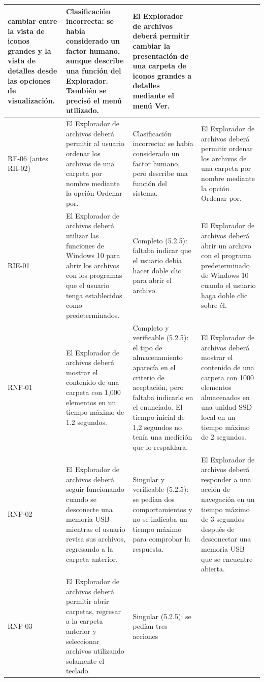 \documentclass[10pt,a4paper]{article}
\begin{document}
{\begin{longtable}{%
>{\raggedright\arraybackslash}p{1cm}%
>{\raggedright\arraybackslash}p{4.8cm}%
>{\raggedright\arraybackslash}p{3.2cm}%
>{\raggedright\arraybackslash}p{5.3cm}%
}
cambiar entre la vista de iconos grandes y la vista
de detalles desde las opciones de visualización. &
Clasificación incorrecta: se había considerado
un factor humano, aunque describe una función
del Explorador. También se precisó el menú utilizado. &
El Explorador de archivos deberá permitir cambiar
la presentación de una carpeta de iconos grandes
a detalles mediante el menú Ver. \\
\hline
RF-06
(antes RH-02) &
El Explorador de archivos deberá permitir al usuario
ordenar los archivos de una carpeta por nombre
mediante la opción Ordenar por. &
Clasificación incorrecta: se había considerado
un factor humano, pero describe una función
del sistema. &
El Explorador de archivos deberá permitir ordenar
los archivos de una carpeta por nombre mediante
la opción Ordenar por. \\
\hline
RIE-01 &
El Explorador de archivos deberá utilizar las funciones
de Windows 10 para abrir los archivos con los programas
que el usuario tenga establecidos como predeterminados. &
Completo (5.2.5): faltaba indicar que el usuario
debía hacer doble clic para abrir el archivo. &
El Explorador de archivos deberá abrir un archivo
con el programa predeterminado de Windows 10
cuando el usuario haga doble clic sobre él. \\
\hline
RNF-01 &
El Explorador de archivos deberá mostrar el contenido
de una carpeta con 1,000 elementos en un tiempo
máximo de 1.2 segundos. &
Completo y verificable (5.2.5): el tipo de
almacenamiento aparecía en el criterio de aceptación,
pero faltaba indicarlo en el enunciado.
El tiempo inicial de 1,2 segundos no tenía
una medición que lo respaldara. &
El Explorador de archivos deberá mostrar el contenido
de una carpeta con 1000 elementos almacenados
en una unidad SSD local en un tiempo máximo
de 2 segundos. \\
\hline
RNF-02 &
El Explorador de archivos deberá seguir funcionando
cuando se desconecte una memoria USB mientras
el usuario revisa sus archivos, regresando a la
carpeta anterior. &
Singular y verificable (5.2.5): se pedían dos
comportamientos y no se indicaba un tiempo
máximo para comprobar la respuesta. &
El Explorador de archivos deberá responder a una
acción de navegación en un tiempo máximo de
3 segundos después de desconectar una memoria USB
que se encuentre abierta. \\
\hline
RNF-03 &
El Explorador de archivos deberá permitir abrir
carpetas, regresar a la carpeta anterior y seleccionar
archivos utilizando solamente el teclado. &
Singular (5.2.5): se pedían tres acciones

\end{longtable}}
\end{document}

